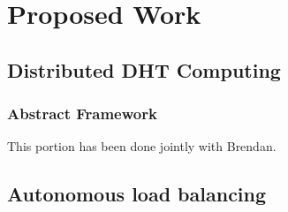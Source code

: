 \chapter{Proposed Work}

\section{Distributed DHT Computing}

\subsection{Abstract Framework}
This portion has been done jointly with Brendan.


\subsection{}


\section{Autonomous load balancing}

\subsubsection{}


